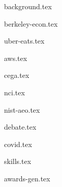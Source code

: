 \documentclass[11pt]{article}
\begin{document}
{background.tex}


{berkeley-econ.tex}


{uber-eats.tex}

{aws.tex}

{cega.tex}

{nci.tex}

{nist-aeo.tex}


{debate.tex}

{covid.tex}


{skills.tex}


{awards-gen.tex}
\end{document}
